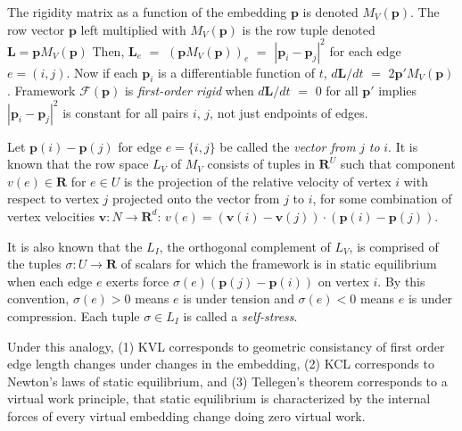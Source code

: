 \documentclass{article}
\def\Reals{\ensuremath{\mathbf R}}
\newcommand{\extra}[1]{{\small{#1}}}
\begin{document}
\extra{
The rigidity matrix as a function of the embedding $\mathbf{p}$ is denoted
$M_V(\mathbf{p})$.  The row vector $\mathbf{p}$ left multiplied with
$M_V(\mathbf{p})$
is the row tuple denoted $\mathbf{L}=\mathbf{p}M_V(\mathbf{p})$  Then, 
$\mathbf{L}_e$ $=$ 
$(\mathbf{p}M_V(\mathbf{p}))_e$ $=$ $|\mathbf{p}_i-\mathbf{p}_j|^2$ for
each edge $e=(i,j)$.  Now if each $\mathbf{p}_i$ is a differentiable function
of $t$, $d\mathbf{L}/dt$ $=$ $2\mathbf{p}'M_V(\mathbf{p})$.  Framework
$\mathcal{F}(\mathbf{p})$ is \textit{first-order rigid} when 
$d\mathbf{L}/dt$ $=$ $0$ for all $\mathbf{p}'$ implies 
$|\mathbf{p}_i-\mathbf{p}_j|^2$ is constant for all pairs $i$, $j$, not just
endpoints of edges. 
}%

Let $\mathbf{p}(i)-\mathbf{p}(j)$ for edge $e=\{i,j\}$ be called the
\textit{vector from } $j$ \textit{to} $i$.  
It is known that the row space $L_V$ 
of $M_V$ consists of tuples in $\Reals^{U}$
such that component $v(e)\in\Reals$ for $e\in U$ is the projection of the
relative velocity of vertex $i$ with respect to vertex $j$ projected onto
the vector from $j$ to $i$, for some combination of vertex velocities 
$\mathbf{v}:N\rightarrow\Reals^d$:
$v(e)=(\mathbf{v}(i)-\mathbf{v}(j))\cdot(\mathbf{p}(i)-\mathbf{p}(j))$.

It is also known that the $L_I$, the orthogonal complement of $L_V$, 
is comprised of the tuples $\sigma:U\rightarrow\Reals$ 
of scalars for which the framework is in static
equilibrium when each edge $e$ exerts force 
$\sigma(e)(\mathbf{p}(j)-\mathbf{p}(i))$ on vertex $i$.  By this convention, 
$\sigma(e)>0$ means $e$ is under tension and $\sigma(e)<0$ means $e$ is under 
compression.  Each tuple $\sigma\in L_I$ is called a \textit{self-stress}.

Under this analogy, 
(1) KVL corresponds to geometric consistancy of first order
edge length changes under changes in the embedding, (2) KCL corresponds to
Newton's laws of static equilibrium, and (3) Tellegen's theorem corresponds
to a virtual work principle, that static equilibrium is
characterized by 
the internal forces of every virtual embedding change 
doing zero virtual work.
\end{document}
